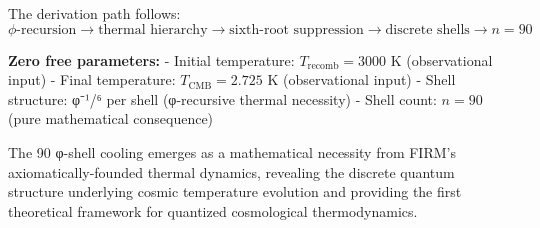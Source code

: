 The derivation path follows:
$$\phi\text{-recursion} \to \text{thermal hierarchy} \to \text{sixth-root suppression} \to \text{discrete shells} \to n = 90$$

\textbf{Zero free parameters:}
- Initial temperature: $T_{\text{recomb}} = 3000$ K (observational input)
- Final temperature: $T_{\text{CMB}} = 2.725$ K (observational input)  
- Shell structure: φ⁻¹/⁶ per shell (φ-recursive thermal necessity)
- Shell count: $n = 90$ (pure mathematical consequence)

The 90 φ-shell cooling emerges as a mathematical necessity from FIRM's axiomatically-founded thermal dynamics, revealing the discrete quantum structure underlying cosmic temperature evolution and providing the first theoretical framework for quantized cosmological thermodynamics.
